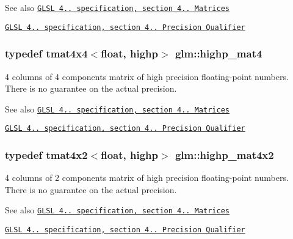 \begin{DoxySeeAlso}{See also}
\href{http://www.opengl.org/registry/doc/GLSLangSpec.4.20.8.pdf}{\tt G\+L\+S\+L 4.. specification, section 4.. Matrices} 

\href{http://www.opengl.org/registry/doc/GLSLangSpec.4.20.8.pdf}{\tt G\+L\+S\+L 4.. specification, section 4.. Precision Qualifier} 
\end{DoxySeeAlso}
\hypertarget{namespaceglm_a02c04d7446add824728c372fd5a4adaf}{}
\subsubsection[{highp\+\_\+mat4}]{\setlength{\rightskip}{0pt plus 5cm}typedef tmat4x4$<$float, highp$>$ {\bf glm\+::highp\+\_\+mat4}}\label{namespaceglm_a02c04d7446add824728c372fd5a4adaf}
4 columns of 4 components matrix of high precision floating-\/point numbers. There is no guarantee on the actual precision.

\begin{DoxySeeAlso}{See also}
\href{http://www.opengl.org/registry/doc/GLSLangSpec.4.20.8.pdf}{\tt G\+L\+S\+L 4.. specification, section 4.. Matrices} 

\href{http://www.opengl.org/registry/doc/GLSLangSpec.4.20.8.pdf}{\tt G\+L\+S\+L 4.. specification, section 4.. Precision Qualifier} 
\end{DoxySeeAlso}
\hypertarget{namespaceglm_afe542544ee5c889f144684842f840e43}{}
\subsubsection[{highp\+\_\+mat4x2}]{\setlength{\rightskip}{0pt plus 5cm}typedef tmat4x2$<$float, highp$>$ {\bf glm\+::highp\+\_\+mat4x2}}\label{namespaceglm_afe542544ee5c889f144684842f840e43}
4 columns of 2 components matrix of high precision floating-\/point numbers. There is no guarantee on the actual precision.

\begin{DoxySeeAlso}{See also}
\href{http://www.opengl.org/registry/doc/GLSLangSpec.4.20.8.pdf}{\tt G\+L\+S\+L 4.. specification, section 4.. Matrices} 

\href{http://www.opengl.org/registry/doc/GLSLangSpec.4.20.8.pdf}{\tt G\+L\+S\+L 4.. specification, section 4.. Precision Qualifier} 
\end{DoxySeeAlso}
\hypertarget{namespaceglm_a0debb266459f3bd097d3f7b3651b473e}{}
